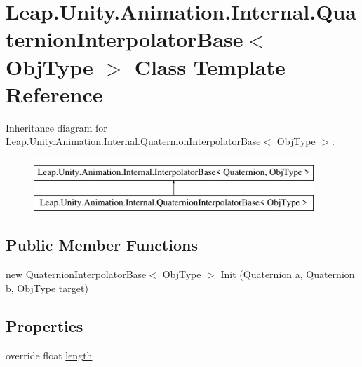 \hypertarget{class_leap_1_1_unity_1_1_animation_1_1_internal_1_1_quaternion_interpolator_base}{}\section{Leap.\+Unity.\+Animation.\+Internal.\+Quaternion\+Interpolator\+Base$<$ Obj\+Type $>$ Class Template Reference}
\label{class_leap_1_1_unity_1_1_animation_1_1_internal_1_1_quaternion_interpolator_base}
Inheritance diagram for Leap.\+Unity.\+Animation.\+Internal.\+Quaternion\+Interpolator\+Base$<$ Obj\+Type $>$\+:\begin{figure}[H]
\begin{center}
\leavevmode
\includegraphics[height=2.000000cm]{class_leap_1_1_unity_1_1_animation_1_1_internal_1_1_quaternion_interpolator_base}
\end{center}
\end{figure}
\subsection*{Public Member Functions}
\begin{DoxyCompactItemize}
\item 
new \mbox{\hyperlink{class_leap_1_1_unity_1_1_animation_1_1_internal_1_1_quaternion_interpolator_base}{Quaternion\+Interpolator\+Base}}$<$ Obj\+Type $>$ \mbox{\hyperlink{class_leap_1_1_unity_1_1_animation_1_1_internal_1_1_quaternion_interpolator_base_acd0eb1c15886d027d785ad8c5aea4289}{Init}} (Quaternion a, Quaternion b, Obj\+Type target)
\end{DoxyCompactItemize}
\subsection*{Properties}
\begin{DoxyCompactItemize}
\item 
override float \mbox{\hyperlink{class_leap_1_1_unity_1_1_animation_1_1_internal_1_1_quaternion_interpolator_base_a2611eb24c8a00b994833cf0c29817423}{length}}
\end{DoxyCompactItemize}
